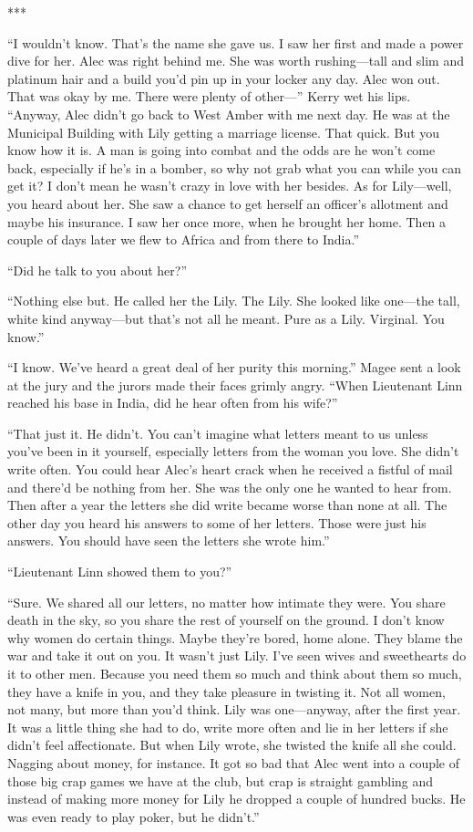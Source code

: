 {***

“I wouldn’t know. That’s the name she gave us. I saw her first and made a power dive for her. Alec was right behind me. She was worth rushing—tall and slim and platinum hair and a build you’d pin up in your locker any day. Alec won out. That was okay by me. There were plenty of other—” Kerry wet his lips. “Anyway, Alec didn’t go back to West Amber with me next day. He was at the Municipal Building with Lily getting a marriage license. That quick. But you know how it is. A man is going into combat and the odds are he won’t come back, especially if he’s in a bomber, so why not grab what you can while you can get it? I don’t mean he wasn’t crazy in love with her besides. As for Lily—well, you heard about her. She saw a chance to get herself an officer’s allotment and maybe his insurance. I saw her once more, when he brought her home. Then a couple of days later we flew to Africa and from there to India.”

“Did he talk to you about her?”

“Nothing else but. He called her the Lily. The Lily. She looked like one—the tall, white kind anyway—but that’s not all he meant. Pure as a Lily. Virginal. You know.”

“I know. We’ve heard a great deal of her purity this morning.” Magee sent a look at the jury and the jurors made their faces grimly angry. “When Lieutenant Linn reached his base in India, did he hear often from his wife?”

“That just it. He didn’t. You can’t imagine what letters meant to us unless you’ve been in it yourself, especially letters from the woman you love. She didn’t write often. You could hear Alec’s heart crack when he received a fistful of mail and there’d be nothing from her. She was the only one he wanted to hear from. Then after a year the letters she did write became worse than none at all. The other day you heard his answers to some of her letters. Those were just his answers. You should have seen the letters she wrote him.”

“Lieutenant Linn showed them to you?”

“Sure. We shared all our letters, no matter how intimate they were. You share death in the sky, so you share the rest of yourself on the ground. I don’t know why women do certain things. Maybe they’re bored, home alone. They blame the war and take it out on you. It wasn’t just Lily. I’ve seen wives and sweethearts do it to other men. Because you need them so much and think about them so much, they have a knife in you, and they take pleasure in twisting it. Not all women, not many, but more than you’d think. Lily was one—anyway, after the first year. It was a little thing she had to do, write more often and lie in her letters if she didn’t feel affectionate. But when Lily wrote, she twisted the knife all she could. Nagging about money, for instance. It got so bad that Alec went into a couple of those big crap games we have at the club, but crap is straight gambling and instead of making more money for Lily he dropped a couple of hundred bucks. He was even ready to play poker, but he didn’t.”

}
